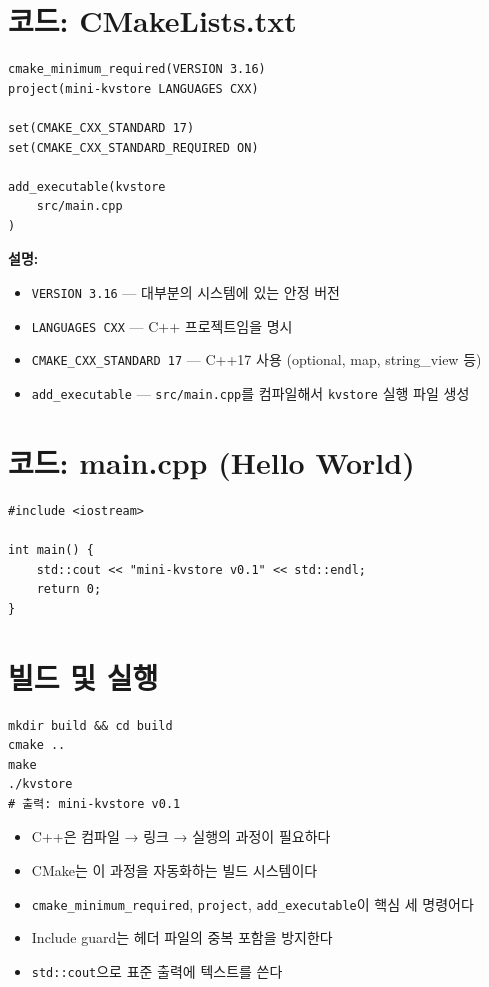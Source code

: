 \documentclass[11pt,a4paper]{book}
\newcommand{\file}[1]{\texttt{#1}}
\newcommand{\code}[1]{\texttt{#1}}
\begin{document}
\section{코드: CMakeLists.txt}

\begin{lstlisting}[style=cmake,title={\file{CMakeLists.txt}}]
cmake_minimum_required(VERSION 3.16)
project(mini-kvstore LANGUAGES CXX)

set(CMAKE_CXX_STANDARD 17)
set(CMAKE_CXX_STANDARD_REQUIRED ON)

add_executable(kvstore
    src/main.cpp
)
\end{lstlisting}

\textbf{설명:}
\begin{itemize}[nosep]
\item \code{VERSION 3.16} — 대부분의 시스템에 있는 안정 버전
\item \code{LANGUAGES CXX} — C++ 프로젝트임을 명시
\item \code{CMAKE\_CXX\_STANDARD 17} — C++17 사용 (optional, map, string\_view 등)
\item \code{add\_executable} — \file{src/main.cpp}를 컴파일해서 \code{kvstore} 실행 파일 생성
\end{itemize}

\section{코드: main.cpp (Hello World)}

\begin{lstlisting}[style=cpp,title={\file{src/main.cpp}}]
#include <iostream>

int main() {
    std::cout << "mini-kvstore v0.1" << std::endl;
    return 0;
}
\end{lstlisting}

\section{빌드 및 실행}

\begin{lstlisting}[style=shell,numbers=none]
mkdir build && cd build
cmake ..
make
./kvstore
# 출력: mini-kvstore v0.1
\end{lstlisting}

\begin{summarybox}
\begin{itemize}[nosep]
\item C++은 컴파일 → 링크 → 실행의 과정이 필요하다
\item CMake는 이 과정을 자동화하는 빌드 시스템이다
\item \code{cmake\_minimum\_required}, \code{project}, \code{add\_executable}이 핵심 세 명령어다
\item Include guard는 헤더 파일의 중복 포함을 방지한다
\item \code{std::cout}으로 표준 출력에 텍스트를 쓴다
\end{itemize}
\end{summarybox}
\end{document}

